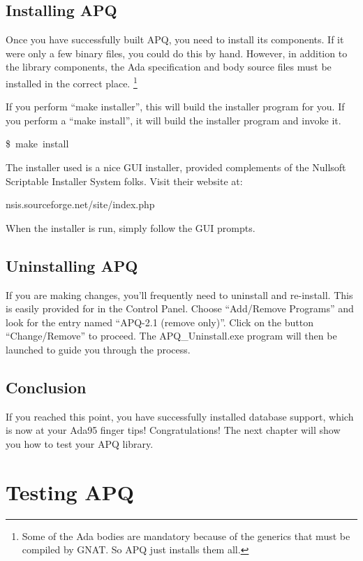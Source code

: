 \documentclass[english]{report}
\newenvironment{lyxcode}
   {\begin{list}{}{
     \setlength{\rightmargin}{\leftmargin}
     \setlength{\listparindent}{0pt}%
     \raggedright
     \setlength{\itemsep}{0pt}
     \setlength{\parsep}{0pt}
     \normalfont\ttfamily}%
    \item[]}
   {\end{list}}
\begin{document}
\section{Installing APQ}

Once you have successfully built APQ, you need to install its components.
If it were only a few binary files, you could do this by hand. However,
in addition to the library components, the Ada specification and body
source files must be installed in the correct place.%
\footnote{Some of the Ada bodies are mandatory because of the generics that
must be compiled by GNAT. So APQ just installs them all.%
}

If you perform {}``make installer'', this will build the installer
program for you. If you perform a {}``make install'', it will build
the installer program and invoke it.

\begin{lyxcode}
\$~make~install
\end{lyxcode}
The installer used is a nice GUI installer, provided complements of
the Nullsoft Scriptable Installer System folks. Visit their website
at:

\begin{lyxcode}
nsis.sourceforge.net/site/index.php
\end{lyxcode}
When the installer is run, simply follow the GUI prompts.


\section{Uninstalling APQ}

If you are making changes, you'll frequently need to uninstall and
re-install. This is easily provided for in the Control Panel. Choose
{}``Add/Remove Programs'' and look for the entry named {}``APQ-2.1
(remove only)''. Click on the button {}``Change/Remove'' to proceed.
The APQ\_Uninstall.exe program will then be launched to guide you
through the process.


\section{Conclusion}

If you reached this point, you have successfully installed database
support, which is now at your Ada95 finger tips! Congratulations!
The next chapter will show you how to test your APQ library.


\chapter{Testing APQ}
\end{document}
